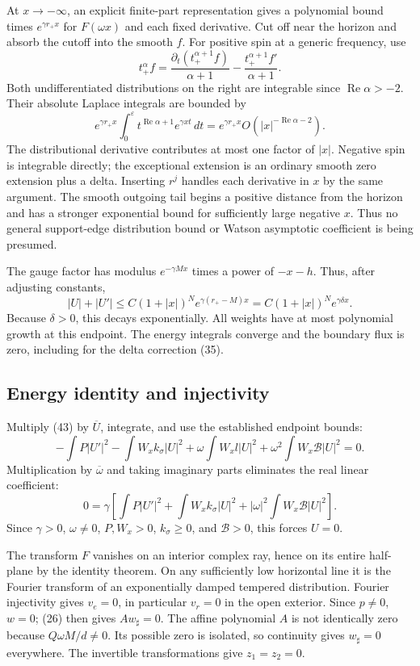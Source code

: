 \documentclass[
  10pt,
  a4paper,
]{article}
\begin{document}
At \(x\to-\infty\), an explicit finite-part representation gives a
polynomial bound times \(e^{\gamma r_+x}\) for \(F(\omega x)\) and each
fixed derivative. Cut off near the horizon and absorb the cutoff into
the smooth \(f\). For positive spin at a generic frequency, use \[
 t_+^\alpha f=
 \frac{\partial_t(t_+^{\alpha+1}f)}{\alpha+1}
 -\frac{t_+^{\alpha+1}f'}{\alpha+1}.
 \tag{48a}
\] Both undifferentiated distributions on the right are integrable since
\(\operatorname{Re}\alpha>-2\). Their absolute Laplace integrals are
bounded by \[
 e^{\gamma r_+x}
 \int_0^\varepsilon t^{\operatorname{Re}\alpha+1}
             e^{\gamma xt}\,dt
 =e^{\gamma r_+x}O(|x|^{-\operatorname{Re}\alpha-2}).
\] The distributional derivative contributes at most one factor of
\(|x|\). Negative spin is integrable directly; the exceptional extension
is an ordinary smooth zero extension plus a delta. Inserting \(r^j\)
handles each derivative in \(x\) by the same argument. The smooth
outgoing tail begins a positive distance from the horizon and has a
stronger exponential bound for sufficiently large negative \(x\). Thus
no general support-edge distribution bound or Watson asymptotic
coefficient is being presumed.

The gauge factor has modulus \(e^{-\gamma Mx}\) times a power of
\(-x-h\). Thus, after adjusting constants, \[
 |U|+|U'|\le C(1+|x|)^N e^{\gamma(r_+-M)x}
          =C(1+|x|)^N e^{\gamma\delta x}.
 \tag{48}
\] Because \(\delta>0\), this decays exponentially. All weights have at
most polynomial growth at this endpoint. The energy integrals converge
and the boundary flux is zero, including for the delta correction (35).

\subsection{Energy identity and
injectivity}\label{energy-identity-and-injectivity}

Multiply (43) by \(\overline U\), integrate, and use the established
endpoint bounds: \[
 -\int P|U'|^2-\int W_x k_\sigma|U|^2
 +\omega\int W_xl|U|^2
 +\omega^2\int W_x\mathcal B|U|^2=0 .
\] Multiplication by \(\overline\omega\) and taking imaginary parts
eliminates the real linear coefficient: \[
 0=\gamma\left[
  \int P|U'|^2+\int W_x k_\sigma|U|^2
  +|\omega|^2\int W_x\mathcal B|U|^2\right].
 \tag{49}
\] Since \(\gamma>0\), \(\omega\ne0\), \(P,W_x>0\), \(k_\sigma\ge0\),
and \(\mathcal B>0\), this forces \(U=0\).

The transform \(F\) vanishes on an interior complex ray, hence on its
entire half-plane by the identity theorem. On any sufficiently low
horizontal line it is the Fourier transform of an exponentially damped
tempered distribution. Fourier injectivity gives \(v_e=0\), in
particular \(v_r=0\) in the open exterior. Since \(p\ne0\), \(w=0\);
(26) then gives \(Aw_\sharp=0\). The affine polynomial \(A\) is not
identically zero because \(Q\omega M/d\ne0\). Its possible zero is
isolated, so continuity gives \(w_\sharp=0\) everywhere. The invertible
transformations give \(z_1=z_2=0\).
\end{document}

